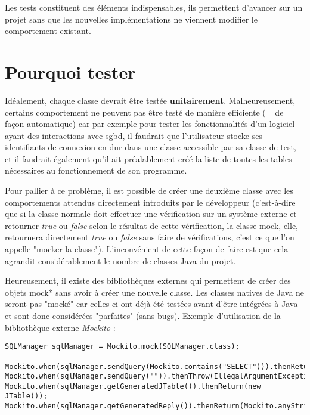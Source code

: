 Les tests constituent des éléments indispensables, ils permettent d'avancer sur un projet sans que les nouvelles implémentations ne viennent modifier le comportement existant.
\section{Pourquoi tester}


Idéalement, chaque classe devrait être testée \textbf{unitairement}.
Malheureusement, certains comportement ne peuvent pas être testé de manière efficiente (= de façon automatique) car par exemple pour tester les fonctionnalités d'un logiciel ayant des interactions avec \gls{sgbd}, il faudrait que l'utilisateur stocke ses identifiants de connexion en dur dans une classe accessible par sa classe de test, et il faudrait également qu'il ait préalablement créé la liste de toutes les tables nécessaires au fonctionnement de son programme.
\bigbreak

Pour pallier à ce problème, il est possible de créer une deuxième classe avec les comportements attendus directement introduits par le développeur (c'est-à-dire que si la classe normale doit effectuer une vérification sur un système externe et retourner \textit{true} ou \textit{false} selon le résultat de cette vérification, la classe mock, elle, retournera directement \textit{true} ou \textit{false} sans faire de vérifications, c'est ce que l'on appelle "\underline{mocker la classe}"). L'inconvénient de cette façon de faire est que cela agrandit considérablement le nombre de classes Java du projet.


\bigbreak
  Heureusement, il existe des bibliothèques externes qui permettent de créer des objets \gls{mock}* sans avoir à créer une nouvelle classe.
Les classes natives de Java ne seront pas "mocké" car celles-ci ont déjà été testées avant d'être intégrées à Java et sont donc considérées "parfaites" (sans bugs).
\bigbreak
Exemple d'utilisation de la bibliothèque externe \textit{Mockito} :

\begin{lstlisting}
SQLManager sqlManager = Mockito.mock(SQLManager.class);

Mockito.when(sqlManager.sendQuery(Mockito.contains("SELECT"))).thenReturn(true);
Mockito.when(sqlManager.sendQuery("")).thenThrow(IllegalArgumentException.class);
Mockito.when(sqlManager.getGeneratedJTable()).thenReturn(new JTable());
Mockito.when(sqlManager.getGeneratedReply()).thenReturn(Mockito.anyString());

\end{lstlisting}
\bigbreak

